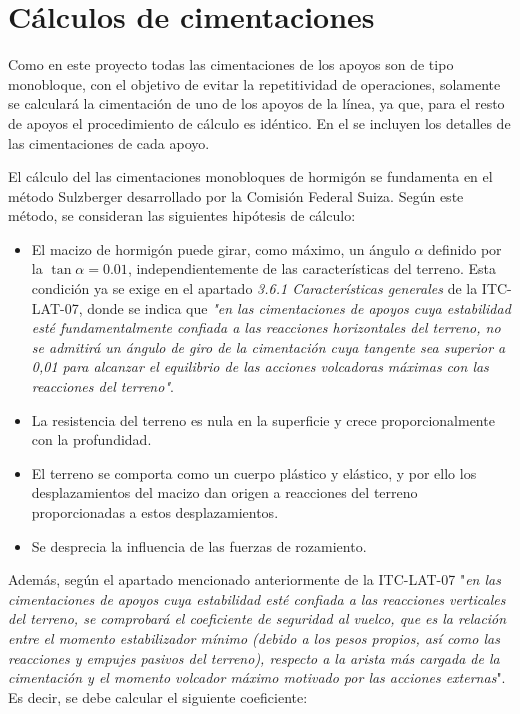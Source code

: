 \section{Cálculos de cimentaciones}
\label{sec:mc-cimentaciones}
Como en este proyecto todas las cimentaciones de los apoyos son de tipo monobloque, con el objetivo de evitar la repetitividad de operaciones, solamente se calculará la cimentación de uno de los apoyos de la línea, ya que, para el resto de apoyos el procedimiento de cálculo es idéntico. En el  se incluyen los detalles de las cimentaciones de cada apoyo.

El cálculo del las cimentaciones monobloques de hormigón se fundamenta en el método Sulzberger desarrollado por la Comisión Federal Suiza. Según este método, se consideran las siguientes hipótesis de cálculo:
\begin{itemize}
    \item El macizo de hormigón puede girar, como máximo, un ángulo $\alpha$ definido por la $\tan\alpha=0.01$, independientemente de las características del terreno. Esta condición ya se exige en el apartado \textit{3.6.1 Características generales} de la ITC-LAT-07, donde se indica que \textit{"en las cimentaciones de apoyos cuya estabilidad esté fundamentalmente confiada a las reacciones horizontales del terreno, no se admitirá un ángulo de giro de la cimentación cuya tangente sea superior a 0,01 para alcanzar el equilibrio de las acciones volcadoras máximas con las reacciones del terreno"}.
    \item La resistencia del terreno es nula en la superficie y crece proporcionalmente con la profundidad.
    \item El terreno se comporta como un cuerpo plástico y elástico, y por ello los desplazamientos del macizo dan origen a reacciones del terreno proporcionadas a estos desplazamientos.
    \item Se desprecia la influencia de las fuerzas de rozamiento.
\end{itemize}

Además, según el apartado mencionado anteriormente de la ITC-LAT-07 "\textit{en las cimentaciones de apoyos cuya estabilidad esté confiada a las reacciones verticales del terreno, se comprobará el coeficiente de seguridad al vuelco, que es la relación entre el momento estabilizador mínimo (debido a los pesos propios, así como las reacciones y empujes pasivos del terreno), respecto a la arista más cargada de la cimentación y el momento volcador máximo motivado por las acciones externas}". Es decir, se debe calcular el siguiente coeficiente:

